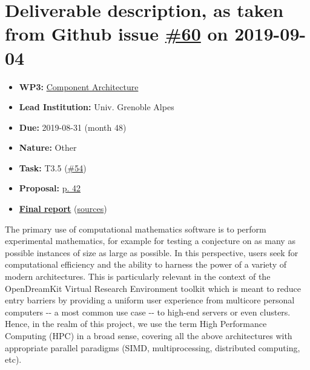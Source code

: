\hypertarget{deliverable-description-as-taken-from-github-issue-60-on-2019-09-04}{%
\section*{\texorpdfstring{Deliverable description, as taken from Github
issue
\href{https://github.com/OpenDreamKit/OpenDreamKit/issues/60}{\#60} on
2019-09-04}{Deliverable description, as taken from Github issue \#60 on 2019-09-04}}\label{deliverable-description-as-taken-from-github-issue-60-on-2019-09-04}}

\begin{itemize}
\tightlist
\item
  \textbf{WP3:}
  \href{https://github.com/OpenDreamKit/OpenDreamKit/tree/master/WP3}{Component
  Architecture}
\item
  \textbf{Lead Institution:} Univ. Grenoble Alpes
\item
  \textbf{Due:} 2019-08-31 (month 48)
\item
  \textbf{Nature:} Other
\item
  \textbf{Task:} T3.5
  (\href{https://github.com/OpenDreamKit/OpenDreamKit/issues/54}{\#54})
\item
  \textbf{Proposal:}
  \href{https://github.com/OpenDreamKit/OpenDreamKit/raw/master/Proposal/proposal-www.pdf}{p.
  42}
\item
  \textbf{\href{https://github.com/OpenDreamKit/OpenDreamKit/raw/master/WP3/D3.11/report-final.pdf}{Final
  report}}
  (\href{https://github.com/OpenDreamKit/OpenDreamKit/raw/master/WP3/D3.11/}{sources})
\end{itemize}

The primary use of computational mathematics software is to perform
experimental mathematics, for example for testing a conjecture on as
many as possible instances of size as large as possible. In this
perspective, users seek for computational efficiency and the ability to
harness the power of a variety of modern architectures. This is
particularly relevant in the context of the OpenDreamKit Virtual
Research Environment toolkit which is meant to reduce entry barriers by
providing a uniform user experience from multicore personal computers
-\/- a most common use case -\/- to high-end servers or even clusters.
Hence, in the realm of this project, we use the term High Performance
Computing (HPC) in a broad sense, covering all the above architectures
with appropriate parallel paradigms (SIMD, multiprocessing, distributed
computing, etc).

